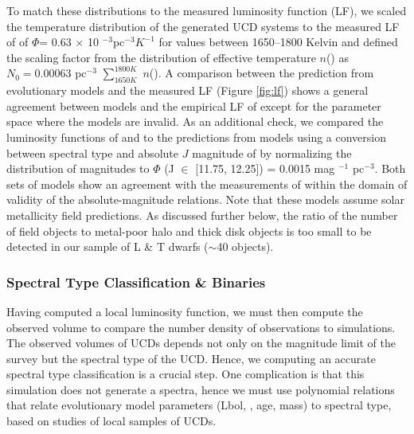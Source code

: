 \documentclass[manuscript]{aastex63}
\begin{document}
To match these distributions to the measured luminosity function (LF), we scaled the temperature distribution of the generated UCD systems to the measured LF of \cite{2019ApJS..240...19K} of $\Phi$= 0.63 $\times$ 10 $^{-3}$pc$^{-3} K^{-1}$ for \teff values between 1650--1800 Kelvin and defined the scaling factor from the distribution of effective temperature $n$(\teff) as $N_0= 0.00063$ pc$^{-3}$ $\sum_{1650 K} ^ {1800 K}$ $n$(\teff). A comparison between the prediction from evolutionary models and the measured LF (Figure \ref{fig:lf}) shows a general agreement between models and the empirical LF of \cite{2019ApJS..240...19K} except for the parameter space where the models are invalid. As an additional check, we compared the luminosity functions of \cite{2019ApJ...883..205B} and \cite{2007astro.ph..2034C} to the predictions from models using a conversion between spectral type and absolute $J$ magnitude of \cite{2012ApJS..201...19D} by normalizing the distribution of magnitudes to $\Phi$ (J $\in$ [11.75, 12.25]) = 0.0015 mag $^{-1}$ pc$^{-3}$. Both sets of models show an agreement with the measurements of \cite{2019ApJ...883..205B}  within the domain of validity of the absolute-magnitude relations. Note that these models assume solar metallicity field predictions. As discussed further below, the ratio of the number of field objects to metal-poor halo and thick disk objects is too small to be detected in our sample of L \& T dwarfs ($\sim$40 objects).

\subsubsection{Spectral Type Classification \& Binaries}
Having computed a local luminosity function, we must then compute the observed volume to compare the number density of observations to simulations. The observed volumes of UCDs depends not only on the magnitude limit of the survey but the spectral type of the UCD. Hence, we computing an accurate spectral type classification is a crucial step. One complication is that this simulation does not generate a spectra, hence we must use polynomial relations that relate evolutionary model parameters (Lbol, \teff, age, mass) to spectral type, based on studies of local samples of UCDs.
\end{document}
